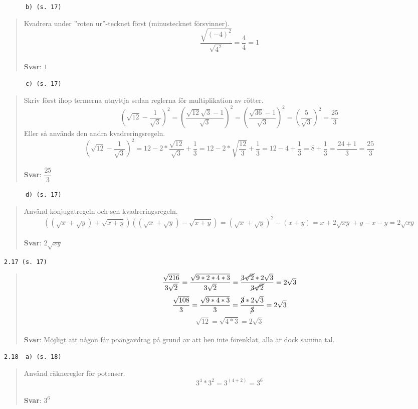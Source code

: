 \documentclass[a4paper]{article}
\newcommand{\tskcol}[1]{\textcolor{tskcol}{#1}}
\begin{document}
	\texttt{\tskcol{~~~~~~b) (s. 17)}}
	\begin{quotation}
		\noindent
		Kvadrera under ''roten ur''-tecknet först (minustecknet försvinner). 
		\[\dfrac{\sqrt{(-4)^2}}{\sqrt{4^2}}=
		\dfrac{4}{4}=
		1\]
		\\
		\textbf{Svar}: $1$
	\end{quotation}
	
	\texttt{\tskcol{~~~~~~c) (s. 17)}}
	\begin{quotation}
		\noindent
		Skriv först ihop termerna utnyttja sedan reglerna för multiplikation av rötter.
		\[\left(\sqrt{12}-\frac{1}{\sqrt{3}}\right)^2=
		\left(\frac{\sqrt{12}\sqrt{3}-1}{\sqrt{3}}\right)^2=
		\left(\frac{\sqrt{36}-1}{\sqrt{3}}\right)^2=
		\left(\frac{5}{\sqrt{3}}\right)^2=
		\frac{25}{3}\]
		Eller så används den andra kvadreringsregeln.
		\[\left(\sqrt{12}-\frac{1}{\sqrt{3}}\right)^2=
		12-2*\dfrac{\sqrt{12}}{\sqrt{3}}+\dfrac{1}{3}=
		12-2*\sqrt{\dfrac{12}{3}}+\dfrac{1}{3}=
		12-4+\dfrac{1}{3}=
		8+\dfrac{1}{3}=
		\dfrac{24+1}{3}=
		\dfrac{25}{3}\]
		\\
		\textbf{Svar}: $\dfrac{25}{3}$
	\end{quotation}
	
	\texttt{\tskcol{~~~~~~d) (s. 17)}}
	\begin{quotation}
		\noindent
		Använd konjugatregeln och sen kvadreringsregeln.
		\[((\sqrt{x}+\sqrt{y})+\sqrt{x+y})((\sqrt{x}+\sqrt{y})-\sqrt{x+y})=
		(\sqrt{x}+\sqrt{y})^2-(x+y)=
		x+2\sqrt{xy}+y-x-y=
		2\sqrt{xy}\]
		\\
		\textbf{Svar}: $2\sqrt{xy}$
	\end{quotation}
	
	\texttt{\tskcol{2.17 (s. 17)}}
	\begin{quotation}
		\noindent
		\[\dfrac{\sqrt{216}}{3\sqrt{2}}=
		\dfrac{\sqrt{9*2*4*3}}{3\sqrt{2}}=
		\dfrac{\cancel{3\sqrt{2}}*2\sqrt{3}}{\cancel{3\sqrt{2}}}=
		2\sqrt{3}\]
		\[\dfrac{\sqrt{108}}{3}=
		\dfrac{\sqrt{9*4*3}}{3}=
		\dfrac{\cancel{3}*2\sqrt{3}}{\cancel{3}}=
		2\sqrt{3}\]
		\[\sqrt{12}=\sqrt{4*3}=2\sqrt{3}\]
		\\
		\textbf{Svar}: Möjligt att någon får poängavdrag på grund av att hen inte förenklat, alla är dock samma tal.
	\end{quotation}
	
	\texttt{\tskcol{2.18~~a) (s. 18)}}
	\begin{quotation}
		\noindent
		Använd räkneregler för potenser.
		\[3^4*3^2=3^{(4+2)}=3^6\]
		\\
		\textbf{Svar}: $3^6$
	\end{quotation}
	
\end{document}
